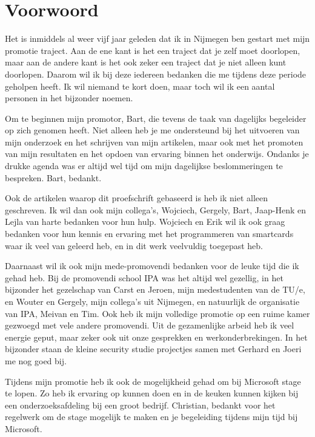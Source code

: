 \chapter*{Voorwoord}

Het is inmiddels al weer vijf jaar geleden dat ik in Nijmegen ben gestart met 
mijn promotie traject. Aan de ene kant is het een traject dat je zelf moet 
doorlopen, maar aan de andere kant is het ook zeker een traject dat je niet 
alleen kunt doorlopen. Daarom wil ik bij deze iedereen bedanken die me tijdens 
deze periode geholpen heeft. Ik wil niemand te kort doen, maar toch wil ik een
aantal personen in het bijzonder noemen.

Om te beginnen mijn promotor, Bart, die tevens de taak van dagelijks begeleider
op zich genomen heeft. Niet alleen heb je me ondersteund bij het uitvoeren van 
mijn onderzoek en het schrijven van mijn artikelen, maar ook met het promoten 
van mijn resultaten en het opdoen van ervaring binnen het onderwijs. Ondanks je
drukke agenda was er altijd wel tijd om mijn dagelijkse beslommeringen te 
bespreken. Bart, bedankt.

Ook de artikelen waarop dit proefschrift gebaseerd is heb ik niet alleen 
geschreven. Ik wil dan ook mijn collega's, Wojciech, Gergely, Bart, Jaap-Henk
en Lejla van harte bedanken voor hun hulp. Wojciech en Erik wil ik ook graag 
bedanken voor hun kennis en ervaring met het programmeren van smartcards waar
ik veel van geleerd heb, en in dit werk veelvuldig toegepast heb.

Daarnaast wil ik ook mijn mede-promovendi bedanken voor de leuke tijd die ik 
gehad heb. Bij de promovendi school IPA was het altijd wel gezellig, in het 
bijzonder het gezelschap van Carst en Jeroen, mijn medestudenten van de TU/e,
en Wouter en Gergely, mijn collega's uit Nijmegen, en natuurlijk de organisatie
van IPA, Meivan en Tim. Ook heb ik mijn volledige promotie op een ruime kamer
gezwoegd met vele andere promovendi. Uit de gezamenlijke arbeid heb ik veel 
energie geput, maar zeker ook uit onze gesprekken en werkonderbrekingen. In het
bijzonder staan de kleine security studie projectjes samen met Gerhard en Joeri
me nog goed bij.

Tijdens mijn promotie heb ik ook de mogelijkheid gehad om bij Microsoft stage 
te lopen. Zo heb ik ervaring op kunnen doen en in de keuken kunnen kijken bij 
een onderzoeksafdeling bij een groot bedrijf. Christian, bedankt voor het
regelwerk om de stage mogelijk te maken en je begeleiding tijdens mijn tijd bij
Microsoft.

